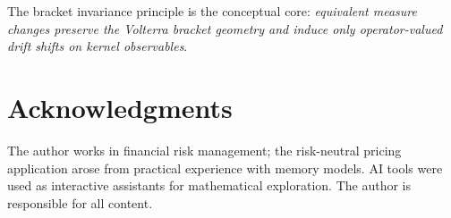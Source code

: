 \documentclass[11pt]{article}
\theoremstyle{plain}
\theoremstyle{definition}
\theoremstyle{remark}
\begin{document}
The bracket invariance principle is the conceptual core: \emph{equivalent
measure changes preserve the Volterra bracket geometry and induce only
operator-valued drift shifts on kernel observables}.

\section*{Acknowledgments}

The author works in financial risk management; the risk-neutral pricing
application arose from practical experience with memory models. AI tools
were used as interactive assistants for mathematical exploration. The
author is responsible for all content.

\end{document}
